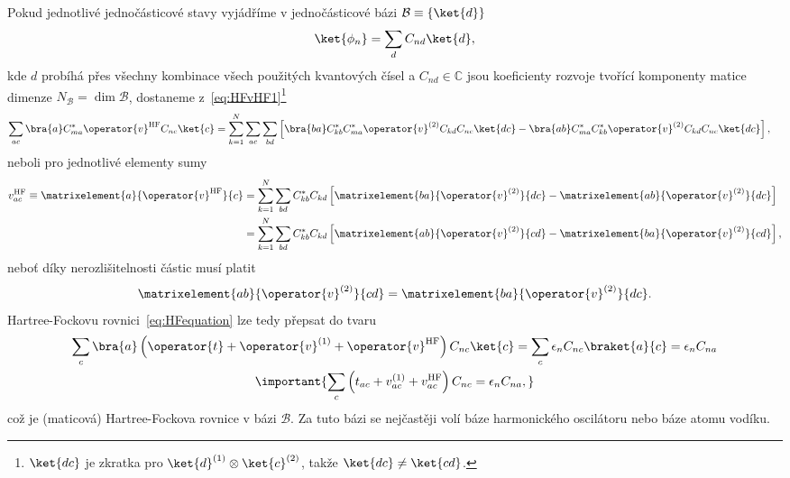     Pokud jednotlivé jednočásticové stavy vyjádříme v jednočásticové bázi $\mathcal{B}\equiv\{\ket{d}\}$
    \begin{equation}
        \ket{\phi_{n}}=\sum_{d}C_{nd}\ket{d},
    \end{equation}
    kde $d$ probíhá přes všechny kombinace všech použitých kvantových čísel a $C_{nd}\in\mathbb{C}$ jsou koeficienty rozvoje tvořící komponenty matice dimenze $N_{\mathcal{B}}=\dim\mathcal{B}$, dostaneme z~\eqref{eq:HFvHF1}\footnote{
        $\ket{dc}$ je zkratka pro $\ket{d}^{(1)}\otimes\ket{c}^{(2)}$, takže $\ket{dc}\neq\ket{cd}$.
    }
    \begin{align}
        \sum_{ac}\bra{a}C_{ma}^{*}\operator{v}^{\text{HF}}C_{nc}\ket{c}
            &=\sum_{k=1}^{N}\sum_{ac}\sum_{bd}\left[\bra{ba}C_{kb}^{*}C_{ma}^{*}\operator{v}^{(2)}C_{kd}C_{nc}\ket{dc}
                -\bra{ab}C_{ma}^{*}C_{kb}^{*}\operator{v}^{(2)}C_{kd}C_{nc}\ket{dc}\right],
    \end{align}
    neboli pro jednotlivé elementy sumy
    \begin{align}
        v_{ac}^{\text{HF}}\equiv\matrixelement{a}{\operator{v}^{\text{HF}}}{c}
            &=\sum_{k=1}^{N}\sum_{bd}C_{kb}^{*}C_{kd}\left[\matrixelement{ba}{\operator{v}^{(2)}}{dc}-\matrixelement{ab}{\operator{v}^{(2)}}{dc}\right]\nonumber\\
            &=\sum_{k=1}^{N}\sum_{bd}C_{kb}^{*}C_{kd}\left[\matrixelement{ab}{\operator{v}^{(2)}}{cd}-\matrixelement{ba}{\operator{v}^{(2)}}{cd}\right],
        \label{eq:HFvHF}
    \end{align}
    neboť díky nerozlišitelnosti částic musí platit
    \begin{equation}
        \matrixelement{ab}{\operator{v}^{(2)}}{cd}=\matrixelement{ba}{\operator{v}^{(2)}}{dc}.
    \end{equation}
    Hartree-Fockovu rovnici~\eqref{eq:HFequation} lze tedy přepsat do tvaru
    \begin{gather}
        \sum_{c}\bra{a}\left(\operator{t}+\operator{v}^{(1)}+\operator{v}^{\text{HF}}\right)C_{nc}\ket{c}
            =\sum_{c}\epsilon_{n}C_{nc}\braket{a}{c}
            =\epsilon_{n}C_{na}\\
            \important{
                \sum_{c}\left(t_{ac}+v_{ac}^{(1)}+v_{ac}^{\text{HF}}\right)C_{nc}=\epsilon_{n}C_{na},
            }
        \label{eq:HFequationB}
    \end{gather}
    což je (maticová) Hartree-Fockova rovnice v bázi $\mathcal{B}$.
    Za tuto bázi se nejčastěji volí báze harmonického oscilátoru nebo báze atomu vodíku.
